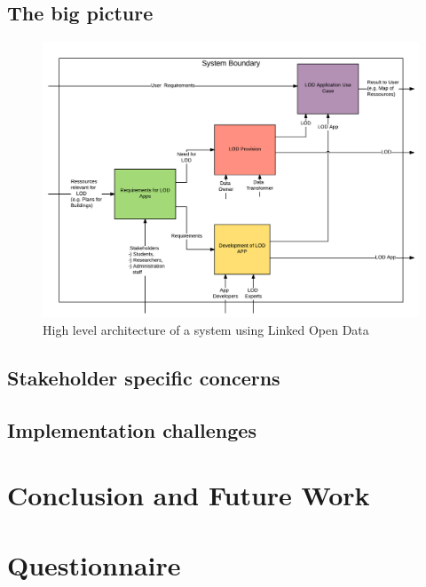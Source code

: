 \documentclass{article}
\begin{document}
\subsection{The big picture}
\begin{figure}[H]
	\centering \includegraphics*[width=.8\columnwidth]{lod_architecture.png}
	\caption{High level architecture of a system using Linked Open Data}
	\label{fig:lod-architecture}
\end{figure}
\subsection{Stakeholder specific concerns}
\subsection{Implementation challenges}

\section{Conclusion and Future Work}

\newpage



\newpage
\appendix
\section{Questionnaire}

\end{document}
